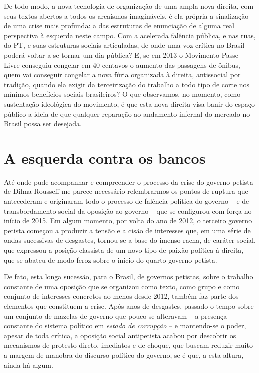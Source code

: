 De todo modo, a nova tecnologia de organização de uma ampla nova
direita, com seus textos abertos a todos os arcaísmos imagináveis, é ela
própria a sinalização de uma crise mais profunda: a das estruturas de
enunciação de alguma real perspectiva à esquerda neste campo. Com a
acelerada falência pública, e nas ruas, do PT, e suas estruturas sociais
articuladas, de onde uma voz crítica no Brasil poderá voltar a se tornar
um dia pública? E, se em 2013 o Movimento Passe Livre conseguiu congelar
em 40 centavos o aumento das passagens de ônibus, quem vai conseguir
congelar a nova fúria organizada à direita, antissocial por tradição,
quando ela exigir da terceirização do trabalho a todo tipo de corte nos
mínimos benefícios sociais brasileiros? O que observamos, no momento,
como sustentação ideológica do movimento, é que esta nova direita visa
banir do espaço público a ideia de que qualquer reparação ao andamento
infernal do mercado no Brasil possa ser desejada.

  \section{A esquerda contra os
  bancos}\label{a-esquerda-contra-os-bancos}

Até onde pude acompanhar e compreender o processo da crise do governo
petista de Dilma Rousseff me parece necessário relembrarmos os pontos de
ruptura que antecederam e originaram todo o processo de falência
política do governo -- e de transbordamento social da oposição ao
governo -- que se configurou com força no início de 2015. Em algum
momento, por volta do ano de 2012, o terceiro governo petista começou a
produzir a tensão e a cisão de interesses que, em uma série de ondas
sucessivas de desgastes, tornou-se a base do imenso racha, de caráter
social, que expressou a posição classista de um novo tipo de paixão
política à direita, que se abateu de modo feroz sobre o início do quarto
governo petista.

De fato, esta longa sucessão, para o Brasil, de governos petistas, sobre
o trabalho constante de uma oposição que se organizou como texto, como
grupo e como conjunto de interesses concretos ao menos desde 2012,
também faz parte dos elementos que constituem a crise. Após anos de
desgastes, passado o tempo sobre um conjunto de mazelas de governo que
pouco se alteravam -- a presença constante do sistema político em
\emph{estado de corrupção} -- e mantendo-se o poder, apesar de toda
crítica, a oposição social antipetista acabou por descobrir os
mecanismos de protesto direto, imediatos e de choque, que buscam reduzir
muito a margem de manobra do discurso político do governo, se é que, a
esta altura, ainda há algum.

